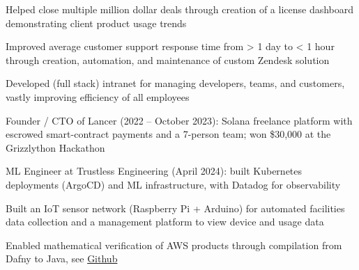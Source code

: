 \documentclass[print]{jack-resume}
\begin{document}
\begin{tightemize}
    \item Helped close multiple million dollar deals through creation of a license dashboard demonstrating client product usage trends
    \item Improved average customer support response time from > 1 day to < 1 hour through creation, automation, and maintenance of custom Zendesk solution
    \item Developed (full stack) intranet for managing developers, teams, and customers, vastly improving efficiency of all employees
\end{tightemize}
\sectionsep

\begin{tightemize}
    \item Founder / CTO of Lancer (2022 – October 2023): Solana freelance platform with escrowed smart-contract payments and a 7-person team; won \$30,000 at the Grizzlython Hackathon
    \item ML Engineer at Trustless Engineering (April 2024): built Kubernetes deployments (ArgoCD) and ML infrastructure, with Datadog for observability
\end{tightemize}
\sectionsep

\begin{tightemize}
    \item Built an IoT sensor network (Raspberry Pi + Arduino) for automated facilities data collection and a management platform to view device and usage data
\end{tightemize}

\begin{tightemize}
    \item Enabled mathematical verification of AWS products through compilation from Dafny to Java, see \href{https://github.com/dafny-lang/dafny}{Github \ExternalLink}
\end{tightemize}
\sectionsep
\end{document}
